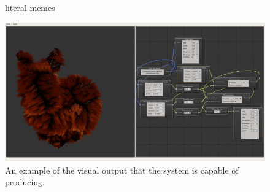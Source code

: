 \documentclass[]{acmsiggraph}
\begin{document}
\begin{figure}[htbp]
\centering
{}
\hfill
{}
\caption{\label{figure:screenshots} literal memes}
\end{figure}

\begin{figure}[htbp]\centering
\includegraphics[width=1.0\linewidth]{images/test_0007}
\caption{\label{figure:screenshot1} An example of the visual output that the system is capable of producing.}
\end{figure}
\end{document}
